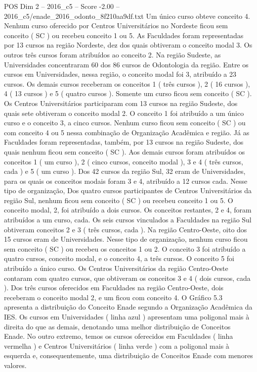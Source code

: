 \begin{textsample}{POS Dim 2 – 2016\_c5 – Score -2.00 – 2016\_c5/enade\_2016\_odonto\_8f210aa9df.txt}
Um único curso obteve conceito 4.
Nenhum curso oferecido por Centros Universitários no Nordeste ficou sem conceito ( SC ) ou recebeu conceito 1 ou 5.
As Faculdades foram representadas por 13 cursos na região Nordeste, dez dos quais obtiveram o conceito modal 3.
Os outros três cursos foram atribuídos ao conceito 2.
Na região Sudeste, as Universidades concentraram 60 dos 86 cursos de Odontologia da região.
Entre os cursos em Universidades, nessa região, o conceito modal foi 3, atribuído a 23 cursos.
Os demais cursos receberam os conceitos 1 ( três cursos ), 2 ( 16 cursos ), 4 ( 13 cursos ) e 5 ( quatro cursos ).
Somente um curso ficou sem conceito ( SC ).
Os Centros Universitários participaram com 13 cursos na região Sudeste, dos quais sete obtiveram o conceito modal 2.
O conceito 1 foi atribuído a um único curso e o conceito 3, a cinco cursos.
Nenhum curso ficou sem conceito ( SC ) ou com conceito 4 ou 5 nessa combinação de Organização Acadêmica e região.
Já as Faculdades foram representadas, também, por 13 cursos na região Sudeste, dos quais nenhum ficou sem conceito ( SC ).
Aos demais cursos foram atribuídos os conceitos 1 ( um curso ), 2 ( cinco cursos, conceito modal ), 3 e 4 ( três cursos, cada ) e 5 ( um curso ).
Dos 42 cursos da região Sul, 32 eram de Universidades, para os quais os conceitos modais foram 3 e 4, atribuído a 12 cursos cada.
Nesse tipo de organização, Dos quatro cursos participantes de Centros Universitários da região Sul, nenhum ficou sem conceito ( SC ) ou recebeu conceito 1 ou 5.
O conceito modal, 2, foi atribuído a dois cursos.
Os conceitos restantes, 2 e 4, foram atribuídos a um curso, cada.
Os seis cursos vinculados a Faculdades na região Sul obtiveram conceitos 2 e 3 ( três cursos, cada ).
Na região Centro-Oeste, oito dos 15 cursos eram de Universidades.
Nesse tipo de organização, nenhum curso ficou sem conceito ( SC ) ou recebeu os conceitos 1 ou 2.
O conceito 3 foi atribuído a quatro cursos, conceito modal, e o conceito 4, a três cursos.
O conceito 5 foi atribuído a único curso.
Os Centros Universitários da região Centro-Oeste contaram com quatro cursos, que obtiveram os conceitos 3 e 4 ( dois cursos, cada ).
Dos três cursos oferecidos em Faculdades na região Centro-Oeste, dois receberam o conceito modal 2, e um ficou com conceito 4.
O Gráfico 5.3 apresenta a distribuição do Conceito Enade segundo a Organização Acadêmica da IES.
Os cursos em Universidades ( linha azul ) apresentam uma poligonal mais à direita do que as demais, denotando uma melhor distribuição de Conceitos Enade.
No outro extremo, temos os cursos oferecidos em Faculdades ( linha vermelha ) e Centros Universitários ( linha verde ) com a poligonal mais à esquerda e, consequentemente, uma distribuição de Conceitos Enade com menores valores.

\end{textsample}
